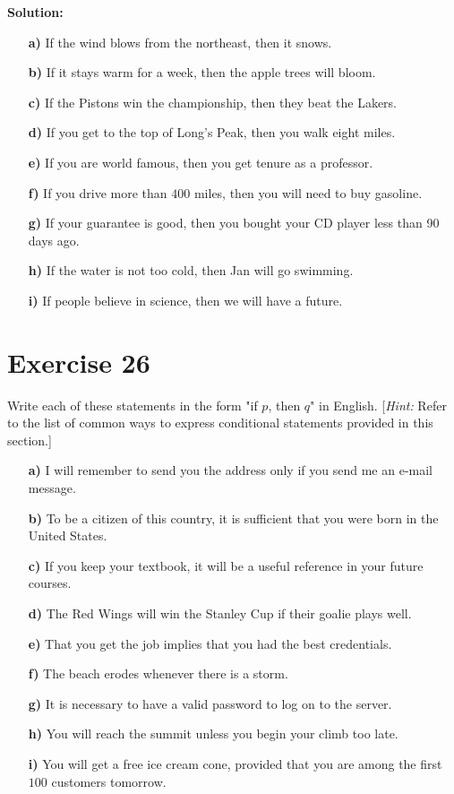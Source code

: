 \documentclass{Axon}
\begin{document}
\noindent
\textbf{Solution:}
\begin{enumerate}
    \item[\textbf{a)}] If the wind blows from the northeast, then it snows.
    \item[\textbf{b)}] If it stays warm for a week, then the apple trees will bloom.
    \item[\textbf{c)}] If the Pistons win the championship, then they beat the Lakers.
    \item[\textbf{d)}] If you get to the top of Long's Peak, then you walk eight miles.
    \item[\textbf{e)}] If you are world famous, then you get tenure as a professor.
    \item[\textbf{f)}] If you drive more than \(400\) miles, then you will need to buy gasoline.
    \item[\textbf{g)}] If your guarantee is good, then you bought your CD player less than 90 days ago.
    \item[\textbf{h)}] If the water is not too cold, then Jan will go swimming.
    \item[\textbf{i)}] If people believe in science, then we will have a future.
\end{enumerate}

\section*{Exercise 26}
Write each of these statements in the form "if \(p\), then \(q\)" in English. [\textit{Hint:} Refer to the list of common ways to express conditional statements provided in this section.]
\begin{enumerate}
    \item[\textbf{a)}] I will remember to send you the address only if you send me an e-mail message.
    \item[\textbf{b)}] To be a citizen of this country, it is sufficient that you were born in the United States.
    \item[\textbf{c)}] If you keep your textbook, it will be a useful reference in your future courses.
    \item[\textbf{d)}] The Red Wings will win the Stanley Cup if their goalie plays well.
    \item[\textbf{e)}] That you get the job implies that you had the best credentials.
    \item[\textbf{f)}] The beach erodes whenever there is a storm.
    \item[\textbf{g)}] It is necessary to have a valid password to log on to the server.
    \item[\textbf{h)}] You will reach the summit unless you begin your climb too late.
    \item[\textbf{i)}] You will get a free ice cream cone, provided that you are among the first \(100\) customers tomorrow.
\end{enumerate}
\end{document}
